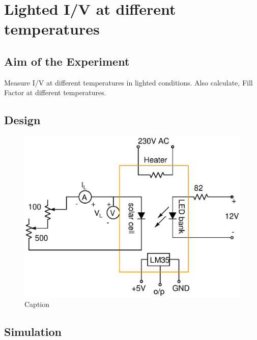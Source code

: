 \documentclass[a4paper]{article}
\begin{document}
\newpage











\section{Lighted I/V at different temperatures}

\subsection{Aim of the Experiment}
Measure I/V at different temperatures in lighted conditions. Also calculate, Fill Factor at different temperatures.

\subsection{Design}
\begin{figure}[h!]
    \centering
    \includegraphics[scale=1]{Ckt_Design_Experiment_2.eps}
    \caption{Caption}
    \label{fig:enter-label}
\end{figure}

\subsection{Simulation}
\end{document}
